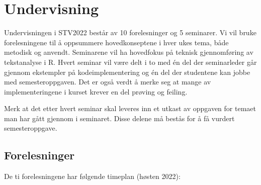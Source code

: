 \documentclass[
]{article}
\begin{document}
\hypertarget{undervisning}{%
\section{Undervisning}\label{undervisning}}

Undervisningen i STV2022 består av 10 forelesninger og 5 seminarer. Vi
vil bruke forelesningene til å oppsummere hovedkonseptene i hver ukes
tema, både metodisk og anvendt. Seminarene vil ha hovedfokus på teknisk
gjennomføring av tekstanalyse i R. Hvert seminar vil være delt i to med
én del der seminarleder går gjennom ekstempler på kodeimplementering og
én del der studentene kan jobbe med semesteroppgaven. Det er også verdt
å merke seg at mange av implementeringene i kurset krever en del prøving
og feiling.

Merk at det etter hvert seminar skal leveres inn et utkast av oppgaven
for temaet man har gått gjennom i seminaret. Disse delene må bestås for
å få vurdert semesteroppgave.

\hypertarget{forelesninger}{%
\subsection{Forelesninger}\label{forelesninger}}

De ti forelesningene har følgende timeplan (høsten 2022):
\end{document}

